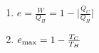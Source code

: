 

\vspace*{\fill}
\centering

\begin{enumerate}
    \item $\displaystyle e = \frac{W}{Q_{H}} = 1 - \Big| \frac{Q_{C}}{Q_{H}} \Big|$ 
    \item $e_{\rm max} = 1 - \frac{T_{C}}{T_{H}}$
\end{enumerate}

\centering
\vspace*{\fill}

